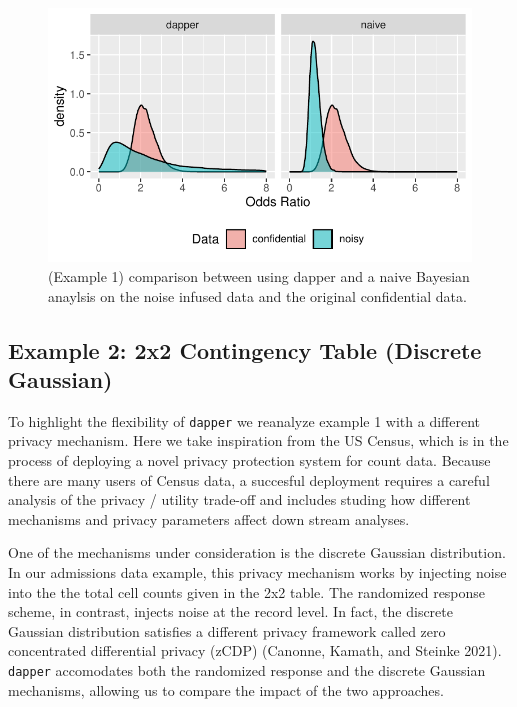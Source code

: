 \begin{figure}

{\centering \includegraphics{dppaper_files/figure-latex/post-or-compare-1} 

}

\caption{(Example 1) comparison between using dapper and a naive Bayesian anaylsis on the
noise infused data and the original confidential data.}\label{fig:post-or-compare}
\end{figure}

\hypertarget{example-2-2x2-contingency-table-discrete-gaussian}{%
\subsection{Example 2: 2x2 Contingency Table (Discrete Gaussian)}\label{example-2-2x2-contingency-table-discrete-gaussian}}

To highlight the flexibility of \texttt{dapper} we reanalyze example 1
with a different privacy mechanism. Here we take inspiration from the US Census,
which is in the process of deploying a novel privacy protection system for count data.
Because there are many users of Census data, a succesful deployment requires
a careful analysis of the privacy / utility trade-off and includes
studing how different mechanisms and privacy parameters affect
down stream analyses.

One of the mechanisms under consideration is the discrete Gaussian distribution.
In our admissions data example, this privacy mechanism works by injecting
noise into the the total cell counts given in the 2x2 table. The
randomized response scheme, in contrast, injects noise at the record level.
In fact, the discrete Gaussian distribution satisfies a different privacy framework called
zero concentrated differential privacy (zCDP) (Canonne, Kamath, and Steinke 2021).
\texttt{dapper} accomodates both the randomized response and
the discrete Gaussian mechanisms, allowing us to compare the impact
of the two approaches.

